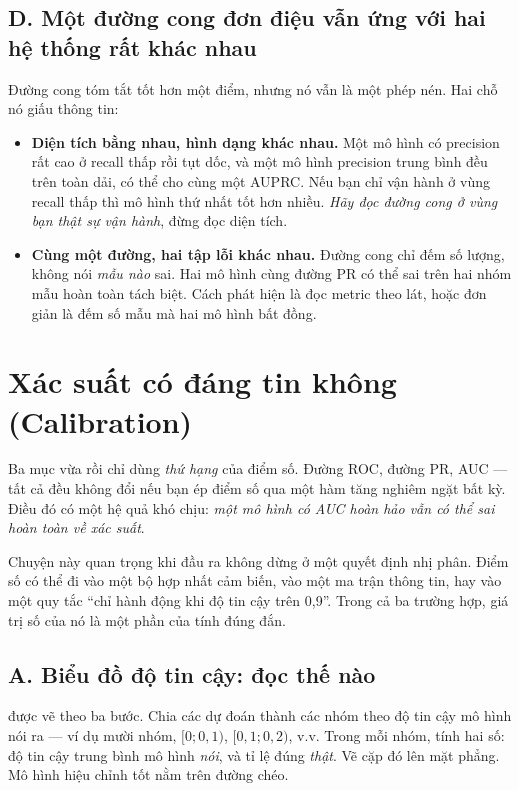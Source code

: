 \documentclass[../../deep_learning.tex]{subfiles}
\begin{document}
\subsection{D. Một đường cong đơn điệu vẫn ứng với hai hệ thống rất khác nhau}
Đường cong tóm tắt tốt hơn một điểm, nhưng nó vẫn là một phép nén. Hai chỗ nó giấu thông tin:

\begin{itemize}
\item \textbf{Diện tích bằng nhau, hình dạng khác nhau.} Một mô hình có precision rất cao ở recall thấp rồi tụt dốc, và một mô hình precision trung bình đều trên toàn dải, có thể cho cùng một AUPRC. Nếu bạn chỉ vận hành ở vùng recall thấp thì mô hình thứ nhất tốt hơn nhiều. \emph{Hãy đọc đường cong ở vùng bạn thật sự vận hành}, đừng đọc diện tích.
\item \textbf{Cùng một đường, hai tập lỗi khác nhau.} Đường cong chỉ đếm số lượng, không nói \emph{mẫu nào} sai. Hai mô hình cùng đường PR có thể sai trên hai nhóm mẫu hoàn toàn tách biệt. Cách phát hiện là đọc metric theo lát, hoặc đơn giản là đếm số mẫu mà hai mô hình bất đồng.
\end{itemize}

\section{Xác suất có đáng tin không (Calibration)}
Ba mục vừa rồi chỉ dùng \emph{thứ hạng} của điểm số. Đường ROC, đường PR, AUC --- tất cả đều không đổi nếu bạn ép điểm số qua một hàm tăng nghiêm ngặt bất kỳ. Điều đó có một hệ quả khó chịu: \emph{một mô hình có AUC hoàn hảo vẫn có thể sai hoàn toàn về xác suất}.

Chuyện này quan trọng khi đầu ra không dừng ở một quyết định nhị phân. Điểm số có thể đi vào một bộ hợp nhất cảm biến, vào một ma trận thông tin, hay vào một quy tắc ``chỉ hành động khi độ tin cậy trên 0{,}9''. Trong cả ba trường hợp, giá trị số của nó là một phần của tính đúng đắn.

\subsection{A. Biểu đồ độ tin cậy: đọc thế nào}
 được vẽ theo ba bước. Chia các dự đoán thành các nhóm theo độ tin cậy mô hình nói ra --- ví dụ mười nhóm, \([0;0{,}1)\), \([0{,}1;0{,}2)\), v.v. Trong mỗi nhóm, tính hai số: độ tin cậy trung bình mô hình \emph{nói}, và tỉ lệ đúng \emph{thật}. Vẽ cặp đó lên mặt phẳng. Mô hình hiệu chỉnh tốt nằm trên đường chéo.
\end{document}
